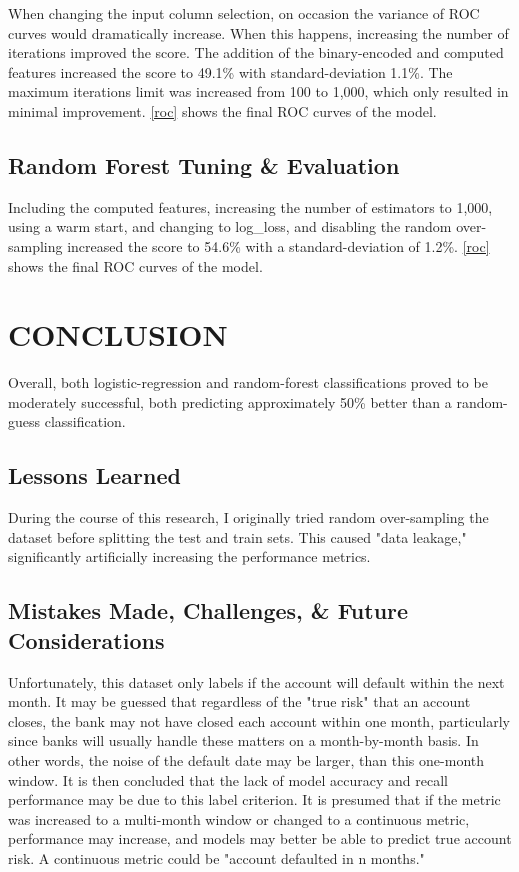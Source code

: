 \documentclass[conference]{IEEEtran}
\begin{document}
When changing the input column selection, on occasion the variance of ROC
curves would dramatically increase. When this happens, increasing the number of
iterations improved the score. The addition of the binary-encoded and computed
features increased the score to 49.1\% with standard-deviation 1.1\%. The
maximum iterations limit was increased from 100 to 1,000, which only resulted
in minimal improvement. \autoref{roc} shows the final ROC curves of the model.

\subsection{Random Forest Tuning \& Evaluation}

Including the computed features, increasing the number of estimators to 1,000,
using a warm start, and changing to log\_loss, and disabling the random
over-sampling increased the score to 54.6\% with a standard-deviation of 1.2\%.
\autoref{roc} shows the final ROC curves of the model.

\FloatBarrier
\section{CONCLUSION}

Overall, both logistic-regression and random-forest classifications proved to
be moderately successful, both predicting approximately 50\% better than a
random-guess classification.

\subsection{Lessons Learned}

During the course of this research, I originally tried random over-sampling the
dataset before splitting the test and train sets. This caused "data leakage,"
significantly artificially increasing the performance metrics.

\subsection{Mistakes Made, Challenges, \& Future Considerations}

Unfortunately, this dataset only labels if the account will default within the
next month. It may be guessed that regardless of the "true risk" that an
account closes, the bank may not have closed each account within one month,
particularly since banks will usually handle these matters on a month-by-month
basis. In other words, the noise of the default date may be larger, than this
one-month window. It is then concluded that the lack of model accuracy and
recall performance may be due to this label criterion. It is presumed that if
the metric was increased to a multi-month window or changed to a continuous
metric, performance may increase, and models may better be able to predict true
account risk. A continuous metric could be "account defaulted in n months."
\end{document}
